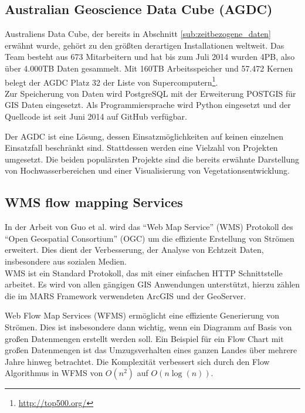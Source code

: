 \documentclass[10pt,conference,compsocconf]{IEEEtran}
\begin{document}
\subsection{Australian Geoscience Data Cube (AGDC)}
Australiens Data Cube, der bereits in Abschnitt \ref{sub:zeitbezogene_daten} erwähnt wurde, gehört zu den größten derartigen Installationen weltweit. Das Team besteht aus 673 Mitarbeitern und hat bis zum Juli 2014 wurden 4PB, also über 4.000TB Daten gesammelt\cite{agdc}. Mit 160TB Arbeitsspeicher und 57.472 Kernen belegt der AGDC Platz 32 der Liste von Supercomputern\footnote{\url{http://top500.org/}}.\\
Zur Speicherung von Daten wird PostgreSQL mit der Erweiterung POSTGIS für GIS Daten eingesetzt. Als Programmiersprache wird Python eingesetzt und der Quellcode ist seit Juni 2014 auf GitHub verfügbar.\par

Der AGDC ist eine Lösung, dessen Einsatzmöglichkeiten auf keinen einzelnen Einsatzfall beschränkt sind. Stattdessen werden eine Vielzahl von Projekten umgesetzt. Die beiden populärsten Projekte sind die bereits erwähnte Darstellung von Hochwasserbereichen und einer Visualisierung von Vegetationsentwicklung\cite{agdc2}.

\subsection{WMS flow mapping Services}
\label{sub:flow_mapping}
In der Arbeit  von Guo et al.\cite{wms_flow_mapping} wird das \enquote{Web Map Service} (WMS) Protokoll des \enquote{Open Geospatial Consortium} (OGC) um die effiziente Erstellung von Strömen erweitert. Dies dient der Verbesserung, der Analyse von Echtzeit Daten, insbesondere aus sozialen Medien.\\
WMS ist ein Standard Protokoll, das mit einer einfachen HTTP Schnittstelle arbeitet. Es wird von allen gängigen GIS Anwendungen unterstützt, hierzu zählen die im MARS Framework verwendeten ArcGIS und der GeoServer.\par

Web Flow Map Services (WFMS) ermöglicht eine effiziente Generierung von Strömen. Dies ist insbesondere dann wichtig, wenn ein Diagramm auf Basis von großen Datenmengen erstellt werden soll. Ein Beispiel für ein Flow Chart mit großen Datenmengen ist das Umzugsverhalten eines ganzen Landes über mehrere Jahre hinweg betrachtet. Die Komplexität verbessert sich durch den Flow Algorithmus in WFMS von $O(n^2 )$ auf $O(n \log (n))$.\par
\end{document}
